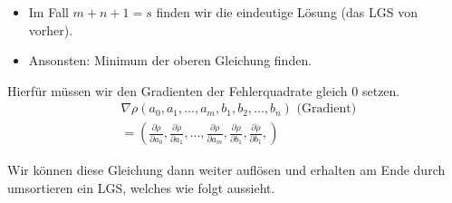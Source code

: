\documentclass[a4paper]{article}
\begin{document}
\begin{itemize}
	\item Im Fall $m+n+1 = s$ finden wir die eindeutige Lösung 
		(das LGS von vorher).
	\item Ansonsten: Minimum der oberen Gleichung finden.
\end{itemize}

Hierfür müssen wir den Gradienten der Fehlerquadrate gleich $0$ setzen.
\begin{align*}
	& \nabla
		\rho \left(
			a_0, a_1, ..., a_m,
			b_1, b_2, ..., b_n
		\right) 
		\text{ (Gradient) }
		\\
	&= \left(
		\frac{ \partial \rho }{ \partial a_0 },
		\frac{ \partial \rho }{ \partial a_1 },
		...,
		\frac{ \partial \rho }{ \partial a_m },
		\frac{ \partial \rho }{ \partial b_1 },
		\frac{ \partial \rho }{ \partial b_1 },
	\right) 
\end{align*}

Wir können diese Gleichung dann weiter auflösen und erhalten am Ende durch
umsortieren ein LGS, welches wie folgt aussieht.
\end{document}
